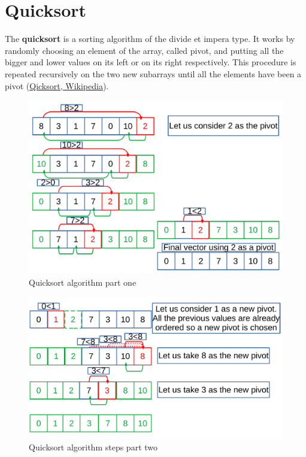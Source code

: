 \section{Quicksort}
The \textbf{quicksort} is a sorting algorithm of the divide et impera type. It works by randomly choosing an element of the array, called pivot, and putting all the bigger and lower values on its left or on its right respectively. This procedure is repeated recursively on the two new subarrays until all the elements have been a pivot \cite{wikiqicksort} (\href{https://en.wikipedia.org/wiki/Quicksort}{Qicksort, Wikipedia}). 
\begin{figure}[H]
	\begin{center}
		\includegraphics[scale=.6]{chapters/searchandsorting/images/sorting_8.pdf}
		\caption[Quicksort algorithm part one]{Quicksort algorithm part one}
		\label{sorting_8}
	\end{center}
\end{figure}

\begin{figure}[H]
	\begin{center}
		\includegraphics[scale=.6]{chapters/searchandsorting/images/sorting_9.pdf}
		\caption[Quicksort algorithm steps part two]{Quicksort algorithm steps part two}
		\label{sorting_9}
	\end{center}
\end{figure}

